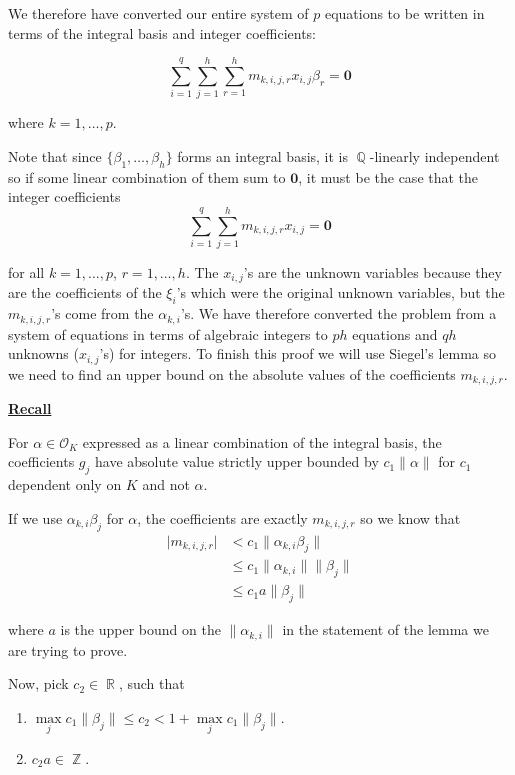 \documentclass[a4paper, 11pt]{book}
\newcommand{\recall}{\underline{\textbf{Recall}} }
\DeclareMathOperator{\Q}{\mathbb{Q}}
\DeclareMathOperator{\R}{\mathbb{R}}
\DeclareMathOperator{\Z}{\mathbb{Z}}
\begin{document}
{We therefore have converted our entire system of $p$ equations to be written in terms of the integral basis and integer coefficients: 

\[\sum\limits_{i=1}^{q}\sum\limits_{j=1}^{h}\sum\limits_{r=1}^{h} m_{k,i,j,r}x_{i,j}\beta_{r} = \mathbf{0}\]

where $k = 1, \ldots, p$.\par

Note that since $\{\beta_1, \ldots, \beta_h\}$ forms an integral basis, it is $\Q$-linearly independent so if some linear combination of them sum to $\mathbf{0}$, it must be the case that the integer coefficients 
\[\sum\limits_{i=1}^{q}\sum\limits_{j=1}^{h} m_{k,i,j,r}x_{i,j} = \mathbf{0}\] 

for all $k = 1, \ldots, p$, $r = 1, \ldots, h$. The $x_{i,j}$'s are the unknown variables because they are the coefficients of the $\xi_i$'s which were the original unknown variables, but the $m_{k,i,j,r}$'s come from the $\alpha_{k,i}$'s. We have therefore converted the problem from a system of equations in terms of algebraic integers to $ph$ equations and $qh$ unknowns ($x_{i,j}$'s) for integers. To finish this proof we will use Siegel's lemma so we need to find an upper bound on the absolute values of the coefficients $m_{k,i,j,r}$.\par

\recall{For $\alpha \in \mathcal{O}_K$ expressed as a linear combination of the integral basis, the coefficients $g_j$ have absolute value strictly upper bounded by $c_1 \| \alpha \|$ for $c_1$ dependent only on $K$ and not $\alpha$.\par}

If we use $\alpha_{k,i}\beta_{j}$ for $\alpha$, the coefficients are exactly $m_{k,i,j,r}$ so we know that 
\begin{align*}
    \vert m_{k,i,j,r} \vert &< c_1 \| \alpha_{k,i}\beta_{j} \|  \\
                            &\leq c_1 \| \alpha_{k, i} \| \| \beta_{j} \| \\ 
                            &\leq c_{1}a \| \beta_{j} \|
\end{align*}

where $a$ is the upper bound on the $\| \alpha_{k,i} \|$ in the statement of the lemma we are trying to prove.\par

Now, pick $c_2 \in \R$, such that
\begin{enumerate}
    \item{$\max\limits_{j} c_{1} \| \beta_{j} \| \leq c_2 < 1 + \max\limits_{j} c_{1} \| \beta_{j} \|$.}
    \item{$c_{2}a \in \Z$.}
\end{enumerate}

}
\end{document}
